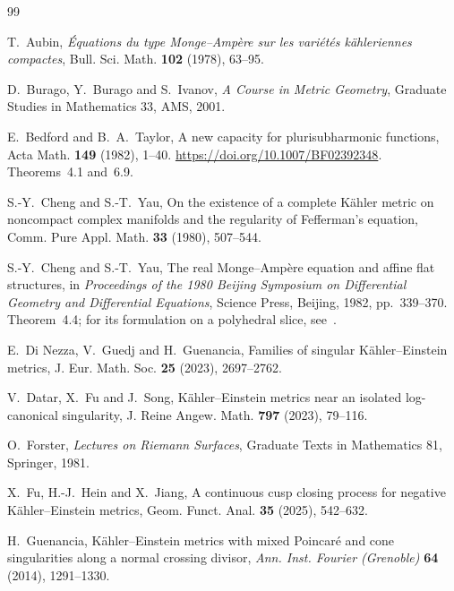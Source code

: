 \documentclass[a4paper,11pt]{ltjsarticle}
\numberwithin{equation}{section}
\theoremstyle{plain}
\theoremstyle{definition}
\theoremstyle{remark}
\begin{document}
\begin{thebibliography}{99}

T.~Aubin,
\newblock \emph{\'Equations du type Monge--Amp\`ere sur les vari\'et\'es k\"ahleriennes compactes},
\newblock Bull. Sci. Math. \textbf{102} (1978), 63--95.

D.~Burago, Y.~Burago and S.~Ivanov,
\newblock \emph{A Course in Metric Geometry},
\newblock Graduate Studies in Mathematics 33, AMS, 2001.

E.~Bedford and B.~A.~Taylor,
\newblock A new capacity for plurisubharmonic functions,
\newblock Acta Math. \textbf{149} (1982), 1--40.
\newblock \url{https://doi.org/10.1007/BF02392348}.
\newblock Theorems~4.1 and~6.9.

S.-Y.~Cheng and S.-T.~Yau,
\newblock On the existence of a complete K\"ahler metric on noncompact complex manifolds and the regularity of Fefferman's equation,
\newblock Comm. Pure Appl. Math. \textbf{33} (1980), 507--544.

S.-Y.~Cheng and S.-T.~Yau,
\newblock The real Monge--Amp\`ere equation and affine flat structures,
\newblock in \emph{Proceedings of the 1980 Beijing Symposium on Differential Geometry and Differential Equations},
Science Press, Beijing, 1982, pp.~339--370.
\newblock Theorem~4.4; for its formulation on a polyhedral slice,
see~\cite[Theorem~2.1]{ZhangNegativeKE}.

E.~Di Nezza, V.~Guedj and H.~Guenancia,
\newblock Families of singular K\"ahler--Einstein metrics,
\newblock J. Eur. Math. Soc. \textbf{25} (2023), 2697--2762.

V.~Datar, X.~Fu and J.~Song,
\newblock K\"ahler--Einstein metrics near an isolated log-canonical singularity,
\newblock J. Reine Angew. Math. \textbf{797} (2023), 79--116.

O.~Forster,
\newblock \emph{Lectures on Riemann Surfaces},
\newblock Graduate Texts in Mathematics 81, Springer, 1981.

X.~Fu, H.-J.~Hein and X.~Jiang,
\newblock A continuous cusp closing process for negative K\"ahler--Einstein metrics,
\newblock Geom. Funct. Anal. \textbf{35} (2025), 542--632.

H.~Guenancia,
\newblock Kähler--Einstein metrics with mixed Poincaré and cone singularities along a normal crossing divisor,
\newblock \emph{Ann. Inst. Fourier (Grenoble)} \textbf{64} (2014), 1291--1330.


\end{thebibliography}
\end{document}
